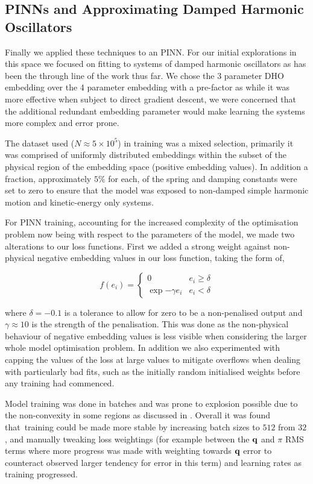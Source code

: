 \subsection{PINNs and Approximating Damped Harmonic Oscillators}

Finally we applied these techniques to an PINN. For our initial explorations in this space we focused on fitting to systems of damped harmonic oscillators as has been the through line of the work thus far. We chose the 3 parameter DHO embedding over the 4 parameter embedding with a pre-factor as while it was more effective when subject to direct gradient descent, we were concerned that the additional redundant embedding parameter would make learning the systems more complex and error prone. 

The dataset used ($N \approx 5 \times 10^5$) in training was a mixed selection, primarily it was comprised of uniformly distributed embeddings within the subset of the physical region of the embedding space (positive embedding values). In addition a fraction, approximately $5 \%$ for each, of the spring and damping constants were set to zero to ensure that the model was exposed to non-damped simple harmonic motion and kinetic-energy only systems.

For PINN training, accounting for the increased complexity of the optimisation problem now being with respect to the parameters of the model, we made two alterations to our loss functions. First we added a strong weight against non-physical negative embedding values in our loss function, taking the form of,

\begin{equation}
  f(e_i) = \begin{cases}
  	0 & e_i \ge \delta \\
  	\exp{-\gamma e_i} & e_i < \delta 
  \end{cases}
\end{equation}

where $\delta = −0.1$ is a tolerance to allow for zero to be a non-penalised output and $\gamma \approx 10$ is the strength of the penalisation. This was done as the non-physical behaviour of negative embedding values is less visible when considering the larger whole model optimisation problem.
In addition we also experimented with capping the values of the loss at large values to mitigate overflows when dealing with particularly bad fits, such as the initially random initialised weights before any training had commenced.

Model training was done in batches and was prone to explosion possible due to the non-convexity in some regions as discussed in . Overall it was found that training could be made more stable by increasing batch sizes to $512$ from $32$, and manually tweaking loss weightings (for example between the $\vb q$ and $\pi$ RMS terms where more progress was made with weighting towards $\vb{q}$ error to counteract observed larger tendency for error in this term) and learning rates as training progressed.

